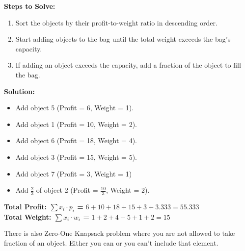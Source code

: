 \documentclass[11pt, a4paper]{article}
\begin{document}
\textbf{Steps to Solve:}
\begin{enumerate}
    \item Sort the objects by their profit-to-weight ratio in descending order.
    \item Start adding objects to the bag until the total weight exceeds the bag's capacity.
    \item If adding an object exceeds the capacity, add a fraction of the object to fill the bag.
\end{enumerate}

\textbf{Solution:}
\begin{itemize}
    \item Add object 5 (Profit = 6, Weight = 1).
    \item Add object 1 (Profit = 10, Weight = 2).
    \item Add object 6 (Profit = 18, Weight = 4).
    \item Add object 3 (Profit = 15, Weight = 5).
    \item Add object 7 (Profit = 3, Weight = 1)
    \item Add $\frac{2}{3}$ of object 2 (Profit = $\frac{10}{3}$, Weight = $2$).
\end{itemize}

\textbf{Total Profit: $\sum x_i\cdot p_i$ = } $6+10+18+15+3+3.333 = 55.333$\\
\textbf{Total Weight: $\sum x_i\cdot w_i$ = } $1 + 2 + 4 + 5 + 1 + 2 = 15$

There is also Zero-One Knapsack problem where you are not allowed to take fraction of an object. Either you can or you can't include that element.
\end{document}
